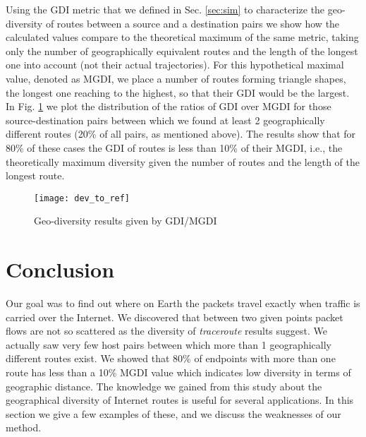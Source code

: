 \documentclass[peerreview]{IEEEtran}
\begin{document}
Using the GDI metric that we defined in Sec. \ref{sec:sim} to characterize the
geo-diversity of routes between a source and a destination pairs we show how the
calculated values compare to the theoretical maximum of the same metric, taking
only the number of geographically equivalent routes and the length of the
longest one into account (not their actual trajectories). For this hypothetical
maximal value, denoted as MGDI, we place a number of routes forming triangle
shapes, the longest one reaching to the highest, so that their GDI would be the
largest. In Fig. \ref{fig:prod_ref} we plot the distribution of the ratios of
GDI over MGDI for those source-destination pairs between which we found at least
2 geographically different routes (20\% of all pairs, as mentioned above). The
results show that for 80\% of these cases the GDI of routes is less than 10\% of
their MGDI, i.e., the theoretically maximum diversity given the number of routes
and the length of the longest route.

\begin{figure}[]
	\centering
	\texttt{[image: dev\_to\_ref]}
	\caption{Geo-diversity results given by GDI/MGDI}
	\label{fig:prod_ref}
\end{figure}

\section{Conclusion}
\label{sec:conclusion}

Our goal was to find out where on Earth the packets travel exactly when traffic
is carried over the Internet. We discovered that between two given points packet
flows are not so scattered as the diversity of \textit{traceroute} results
suggest. We actually saw very few host pairs between which more than 1
geographically different routes exist. We showed that 80\% of endpoints with
more than one route has less than a 10\% MGDI value which indicates low
diversity in terms of geographic distance. The knowledge we gained from this
study about the geographical diversity of Internet routes is useful for several
applications. In this section we give a few examples of these, and we discuss
the weaknesses of our method.
\end{document}

